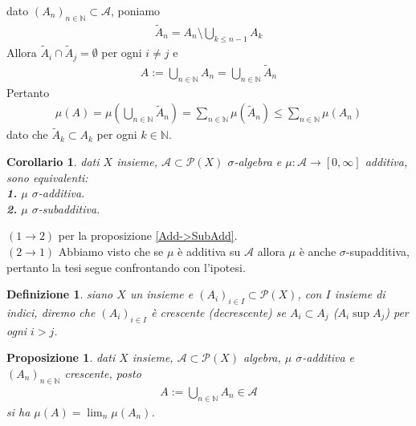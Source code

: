 \documentclass[oneside, 11pt]{amsbook}
\makeatletter
\newcommand{\0}{{(0)}}
\newcommand{\3}{{(3)}}
\theoremstyle{colonplain}
\newtheorem{prop}[thm]{Proposizione}
\newtheorem{cor}[thm]{Corollario}
\theoremstyle{colondefinition}
\newtheorem{defn}[thm]{Definizione}
\theoremstyle{colonremark}
\numberwithin{equation}{chapter}
\renewcommand{\proofname}{Dimostrazione}
\renewenvironment{proof}[1][\proofname]{\par
  \pushQED{\qed}%
  \normalfont \topsep6\p@\@plus6\p@\relax
  \trivlist
  \item[\hskip\labelsep\bfseries #1:]\ignorespaces
}{%
  \popQED\endtrivlist\@endpefalse
}
\makeatother
\begin{document}
\begin{proof}
dato $(A_n)_{n \in \mathbb{N}} \subset \mathcal{A}$, poniamo
\begin{align}
    \widetilde{A}_n = A_n \setminus \bigcup_{k \leq n - 1} A_k
\end{align}
Allora $\widetilde{A}_i \cap \widetilde{A}_j = \emptyset$ per ogni $i \neq j$ e
\begin{align}
    A := \bigcup_{n \in \mathbb{N}} A_n = \bigcup_{n \in \mathbb{N}} \widetilde{A}_n
\end{align}
Pertanto
\begin{align}
    \mu(A) = \mu\left(\bigcup_{n \in \mathbb{N}} \widetilde{A}_n\right) = \sum_{n \in \mathbb{N}} \mu(\widetilde{A}_n) \leq \sum_{n \in \mathbb{N}} \mu(A_n)
\end{align}
dato che $\widetilde{A}_k \subset A_k$ per ogni $k \in \mathbb{N}$.
\end{proof}
\begin{cor}
dati $X$ insieme, $\mathcal{A} \subset \mathcal{P}(X)$ $\sigma$-algebra e $\mu : \mathcal{A} \longrightarrow [0, \infty]$ additiva, sono equivalenti: \\
\textbf{1.} $\mu$ $\sigma$-additiva. \\
\textbf{2.} $\mu$ $\sigma$-subadditiva.
\end{cor}

\begin{proof}
$(1 \rightarrow 2)$ per la proposizione \ref{Add->SubAdd}. \\
$(2 \rightarrow 1)$ Abbiamo visto che se $\mu$ è additiva su $\mathcal{A}$ allora $\mu$ è anche $\sigma$-supadditiva, pertanto la tesi segue confrontando con l'ipotesi.
\end{proof}
\begin{defn}
siano $X$ un insieme e $(A_i)_{i \in I} \subset \mathcal{P}(X)$, con $I$ insieme di indici, diremo che $(A_i)_{i \in I}$ è \textit{crescente} (\textit{decrescente}) se $A_i \subset A_j$ ($A_i \sup A_j$) per ogni $i > j$.
\end{defn}
\begin{prop}\label{LimCresc}
dati $X$ insieme, $\mathcal{A} \subset \mathcal{P}(X)$ algebra, $\mu$ $\sigma$-additiva e $(A_n)_{n \in \mathbb{N}}$ crescente, posto
\begin{align}
    A := \bigcup_{n \in \mathbb{N}} A_n \in \mathcal{A}
\end{align}
si ha $\mu(A) = \lim_n \mu(A_n)$.
\end{prop}
\end{document}
